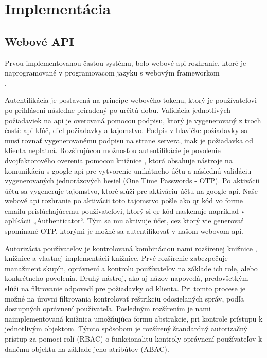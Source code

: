 \chapter{Implementácia}\label{ch:implementácia}

\section{Webové API}\label{sec:webove-api}

Prvou implementovanou časťou systému, bolo webové api rozhranie, ktoré je naprogramované v programovacom jazyku 
s webovým frameworkom \\ .

Autentifikácia je postavená na princípe webového tokenu, ktorý je používateľovi po prihlásení následne priradený po určitú dobu.
Validácia jednotlivých požiadaviek na api je overovaná pomocou podpisu, ktorý je vygenerovaný z troch častí: api kľúč, diel
požiadavky a tajomstvo.
Podpis v hlavičke požiadavky sa musí rovnať vygenerovanému podpisu na strane servera, inak je požiadavka od klienta neplatná.
Rozširujúcou možnosťou autentifikácie je povolenie dvojfaktorového overenia pomocou knižnice , ktorá obsahuje
nástroje na komunikáciu s google api pre vytvorenie unikátneho účtu a následnú validáciu vygenerovaných jednorázových hesiel
(One Time Passwords - OTP).
Po aktivácii účtu sa vygeneruje tajomstvo, ktoré slúži pre aktiváciu účtu na google api.
Naše webové api rozhranie po aktivácii toto tajomstvo pošle ako qr kód vo forme emailu prislúchajúcemu používateľovi, ktorý si
qr kód naskenuje napríklad v aplikácii „Authenticator“.
Tým sa mu aktivuje účet, cez ktorý vie generovať spomínané OTP, ktorými je možné sa autentifikovať v našom webovom api.

Autorizácia používateľov je kontrolovaná kombináciou nami rozšírenej knižnice , knižnice
 a vlastnej implementácii knižnice\newline{}.
Prvé rozšírenie zabezpečuje manažment skupín, oprávnení a kontrolu používateľov na základe ich role, alebo konkrétneho povolenia.
Druhý nástroj, ako aj názov napovedá, predovšetkým slúži na filtrovanie odpovedí pre požiadavky od klienta.
Pri tomto procese je možné na úrovni filtrovania kontrolovať reštrikciu odosielaných správ, podľa dostupných oprávnení používateľa.
Posledným rozšírením je nami naimplementovaná knižnica umožňujúca formu abstrakcie, pri kontrole prístupu k jednotlivým objektom.
Týmto spôsobom je rozšírený štandardný autorizačný prístup za pomoci rolí (RBAC) o funkcionalitu kontroly oprávnení používateľov k
danému objektu na základe jeho atribútov (ABAC).


